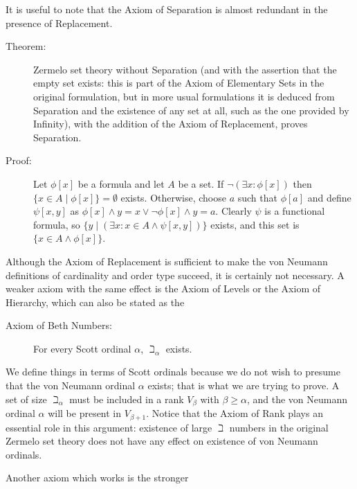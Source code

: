 \documentclass[12pt]{book}
\begin{document}
It is useful to note that the Axiom of Separation is almost redundant in the presence of Replacement.  

\begin{description}

\item[Theorem:]  Zermelo set theory without Separation (and with the assertion that the empty set exists:  this is part of the Axiom of Elementary Sets in the original formulation, but in more usual formulations it is deduced from Separation and the existence of any set at all, such as the one provided by Infinity), with the addition of the Axiom of Replacement,  proves Separation.

\item[Proof:]  Let $\phi[x]$ be a formula and let $A$ be a set.  If $\neg(\exists x:\phi[x])$ then $\{x \in A\mid \phi[x]\} = \emptyset$ exists.  Otherwise, choose $a$ such that $\phi[a]$ and define $\psi[x,y]$ as $\phi[x] \wedge y=x \vee \neg \phi[x] \wedge y=a$.  Clearly $\psi$ is a functional formula,
so $\{y \mid (\exists x:x \in A \wedge \psi[x,y])\}$ exists, and this set is $\{x \in A \wedge \phi[x]\}$.

\end{description}

Although the Axiom of Replacement is sufficient to make the von
Neumann definitions of cardinality and order type succeed, it is
certainly not necessary.  A weaker axiom with the same effect is the Axiom of Levels or the Axiom of Hierarchy, which can also be stated as the

\begin{description}

\item[Axiom of Beth Numbers:] For every Scott ordinal $\alpha$,
$\beth_{\alpha}$ exists.

\end{description}

We define things in terms of Scott ordinals because we do not wish to
presume that the von Neumann ordinal $\alpha$ exists; that is what we
are trying to prove.  A set of size $\beth_{\alpha}$ must be included
in a rank $V_{\beta}$ with $\beta\geq \alpha$, and the von Neumann
ordinal $\alpha$ will be present in $V_{\beta+1}$.  Notice that the
Axiom of Rank plays an essential role in this argument: existence of
large $\beth$ numbers in the original Zermelo set theory does not have
any effect on existence of von Neumann ordinals.

Another axiom which works is the stronger
\end{document}
